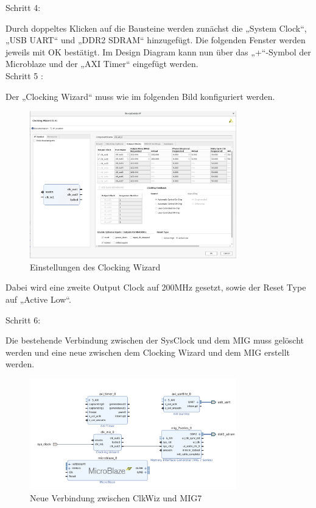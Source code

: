 Schritt 4:

Durch doppeltes Klicken auf die Bausteine werden zunächst die „System Clock“, „USB UART“ und „DDR2 SDRAM“ hinzugefügt. Die folgenden Fenster werden jeweils mit OK bestätigt.
Im Design Diagram kann nun über das „+“-Symbol der Microblaze und der „AXI Timer“ eingefügt werden.\\


Schritt 5 :


Der „Clocking Wizard“ muss wie im folgenden Bild konfiguriert werden.

\begin{figure}[H]
\centering
\includegraphics[width=0.8\textwidth]{Hauptteil/Schritt5.png}
\caption{Einstellungen des Clocking Wizard}
\label{fig:mbschritt5}
\end{figure}

Dabei wird eine zweite Output Clock auf 200MHz gesetzt, sowie der Reset Type auf „Active Low“.


Schritt 6:

Die bestehende Verbindung zwischen der SysClock und dem MIG muss gelöscht werden und eine neue zwischen dem Clocking Wizard und dem MIG erstellt werden.

\begin{figure}[H]
\centering
\includegraphics[width=0.8\textwidth]{Hauptteil/schritt6.png}
\caption{Neue Verbindung zwischen ClkWiz und MIG7}
\label{fig:mbschritt6}
\end{figure}


